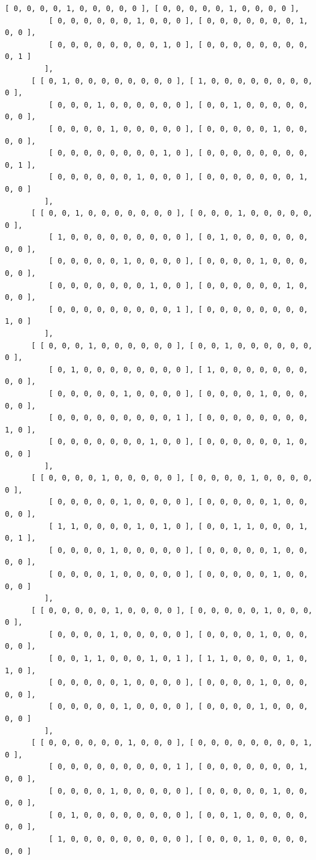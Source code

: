 \documentclass[a4paper, 10pt]{book}
\theoremstyle{definition}
\numberwithin{equation}{chapter}
\begin{document}
\begin{appendices}
\begin{enumerate}
\begin{lstlisting}[numbers=none]
          [ 0, 0, 0, 0, 1, 0, 0, 0, 0, 0 ], [ 0, 0, 0, 0, 0, 1, 0, 0, 0, 0 ],
          [ 0, 0, 0, 0, 0, 0, 1, 0, 0, 0 ], [ 0, 0, 0, 0, 0, 0, 0, 1, 0, 0 ],
          [ 0, 0, 0, 0, 0, 0, 0, 0, 1, 0 ], [ 0, 0, 0, 0, 0, 0, 0, 0, 0, 1 ] 
         ], 
      [ [ 0, 1, 0, 0, 0, 0, 0, 0, 0, 0 ], [ 1, 0, 0, 0, 0, 0, 0, 0, 0, 0 ], 
          [ 0, 0, 0, 1, 0, 0, 0, 0, 0, 0 ], [ 0, 0, 1, 0, 0, 0, 0, 0, 0, 0 ],
          [ 0, 0, 0, 0, 1, 0, 0, 0, 0, 0 ], [ 0, 0, 0, 0, 0, 1, 0, 0, 0, 0 ],
          [ 0, 0, 0, 0, 0, 0, 0, 0, 1, 0 ], [ 0, 0, 0, 0, 0, 0, 0, 0, 0, 1 ],
          [ 0, 0, 0, 0, 0, 0, 1, 0, 0, 0 ], [ 0, 0, 0, 0, 0, 0, 0, 1, 0, 0 ] 
         ], 
      [ [ 0, 0, 1, 0, 0, 0, 0, 0, 0, 0 ], [ 0, 0, 0, 1, 0, 0, 0, 0, 0, 0 ], 
          [ 1, 0, 0, 0, 0, 0, 0, 0, 0, 0 ], [ 0, 1, 0, 0, 0, 0, 0, 0, 0, 0 ],
          [ 0, 0, 0, 0, 0, 1, 0, 0, 0, 0 ], [ 0, 0, 0, 0, 1, 0, 0, 0, 0, 0 ],
          [ 0, 0, 0, 0, 0, 0, 0, 1, 0, 0 ], [ 0, 0, 0, 0, 0, 0, 1, 0, 0, 0 ],
          [ 0, 0, 0, 0, 0, 0, 0, 0, 0, 1 ], [ 0, 0, 0, 0, 0, 0, 0, 0, 1, 0 ] 
         ], 
      [ [ 0, 0, 0, 1, 0, 0, 0, 0, 0, 0 ], [ 0, 0, 1, 0, 0, 0, 0, 0, 0, 0 ], 
          [ 0, 1, 0, 0, 0, 0, 0, 0, 0, 0 ], [ 1, 0, 0, 0, 0, 0, 0, 0, 0, 0 ],
          [ 0, 0, 0, 0, 0, 1, 0, 0, 0, 0 ], [ 0, 0, 0, 0, 1, 0, 0, 0, 0, 0 ],
          [ 0, 0, 0, 0, 0, 0, 0, 0, 0, 1 ], [ 0, 0, 0, 0, 0, 0, 0, 0, 1, 0 ],
          [ 0, 0, 0, 0, 0, 0, 0, 1, 0, 0 ], [ 0, 0, 0, 0, 0, 0, 1, 0, 0, 0 ] 
         ], 
      [ [ 0, 0, 0, 0, 1, 0, 0, 0, 0, 0 ], [ 0, 0, 0, 0, 1, 0, 0, 0, 0, 0 ], 
          [ 0, 0, 0, 0, 0, 1, 0, 0, 0, 0 ], [ 0, 0, 0, 0, 0, 1, 0, 0, 0, 0 ],
          [ 1, 1, 0, 0, 0, 0, 1, 0, 1, 0 ], [ 0, 0, 1, 1, 0, 0, 0, 1, 0, 1 ],
          [ 0, 0, 0, 0, 1, 0, 0, 0, 0, 0 ], [ 0, 0, 0, 0, 0, 1, 0, 0, 0, 0 ],
          [ 0, 0, 0, 0, 1, 0, 0, 0, 0, 0 ], [ 0, 0, 0, 0, 0, 1, 0, 0, 0, 0 ] 
         ], 
      [ [ 0, 0, 0, 0, 0, 1, 0, 0, 0, 0 ], [ 0, 0, 0, 0, 0, 1, 0, 0, 0, 0 ], 
          [ 0, 0, 0, 0, 1, 0, 0, 0, 0, 0 ], [ 0, 0, 0, 0, 1, 0, 0, 0, 0, 0 ],
          [ 0, 0, 1, 1, 0, 0, 0, 1, 0, 1 ], [ 1, 1, 0, 0, 0, 0, 1, 0, 1, 0 ],
          [ 0, 0, 0, 0, 0, 1, 0, 0, 0, 0 ], [ 0, 0, 0, 0, 1, 0, 0, 0, 0, 0 ],
          [ 0, 0, 0, 0, 0, 1, 0, 0, 0, 0 ], [ 0, 0, 0, 0, 1, 0, 0, 0, 0, 0 ] 
         ], 
      [ [ 0, 0, 0, 0, 0, 0, 1, 0, 0, 0 ], [ 0, 0, 0, 0, 0, 0, 0, 0, 1, 0 ], 
          [ 0, 0, 0, 0, 0, 0, 0, 0, 0, 1 ], [ 0, 0, 0, 0, 0, 0, 0, 1, 0, 0 ],
          [ 0, 0, 0, 0, 1, 0, 0, 0, 0, 0 ], [ 0, 0, 0, 0, 0, 1, 0, 0, 0, 0 ],
          [ 0, 1, 0, 0, 0, 0, 0, 0, 0, 0 ], [ 0, 0, 1, 0, 0, 0, 0, 0, 0, 0 ],
          [ 1, 0, 0, 0, 0, 0, 0, 0, 0, 0 ], [ 0, 0, 0, 1, 0, 0, 0, 0, 0, 0 ] 

\end{lstlisting}
\end{enumerate}
\end{appendices}
\end{document}
